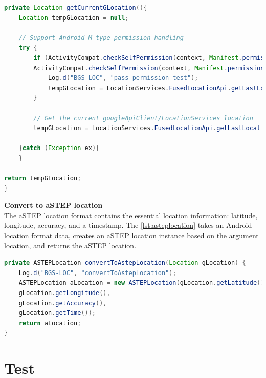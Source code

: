 \begin{lstlisting}[caption={getCurrentLocation},label={lst:getCurrentLocation},language=Java]
private Location getCurrentGLocation(){
	Location tempGLocation = null;

	// Support Android M type permission handling
	try {
		if (ActivityCompat.checkSelfPermission(context, Manifest.permission.ACCESS_FINE_LOCATION) != PackageManager.PERMISSION_GRANTED &&
		ActivityCompat.checkSelfPermission(context, Manifest.permission.ACCESS_COARSE_LOCATION) != PackageManager.PERMISSION_GRANTED) {
			Log.d("BGS-LOC", "pass permission test");
			tempGLocation = LocationServices.FusedLocationApi.getLastLocation(googleApiClient);
		}

		// Get the current googleApiClient/LocationServices location
		tempGLocation = LocationServices.FusedLocationApi.getLastLocation(googleApiClient);

	}catch (Exception ex){
	}

return tempGLocation;
}
\end{lstlisting}

\textbf{Convert to aSTEP location}\\
The aSTEP location format contains the essential location information: latitude, longitude, accuracy, and a timestamp.
The \ref{lst:asteplocation} takes an Android location format data, creates an aSTEP location instance based on the argument location, and returns the aSTEP location.

\begin{lstlisting}[caption={ASTEPLocation()},label={lst:asteplocation},language=Java]
private ASTEPLocation convertToAstepLocation(Location gLocation) {
	Log.d("BGS-LOC", "convertToAstepLocation");
	ASTEPLocation aLocation = new ASTEPLocation(gLocation.getLatitude(),
	gLocation.getLongitude(),
	gLocation.getAccuracy(),
	gLocation.getTime());
	return aLocation;
}
\end{lstlisting}





\section{Test} \DIFdelbegin {}\DIFdelend \DIFaddbegin \label{sec:s2test}


